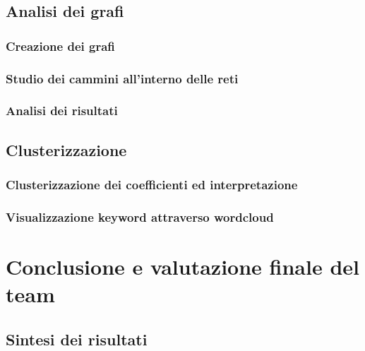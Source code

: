 \documentclass[12pt]{article}
\begin{document}
	\subsection{Analisi dei grafi}
	\subsubsection{Creazione dei grafi}
	\subsubsection{Studio dei cammini all'interno delle reti}
	\subsubsection{Analisi dei risultati}
	\subsection{Clusterizzazione}
	\subsubsection{Clusterizzazione dei coefficienti ed interpretazione}
	\subsubsection{Visualizzazione keyword attraverso wordcloud}
	\section{Conclusione e valutazione finale del team}
	\subsection{Sintesi dei risultati}
	
	
\end{document}
